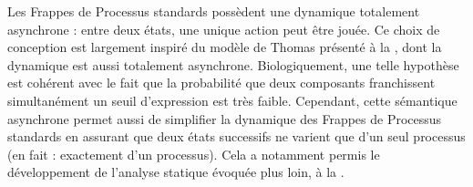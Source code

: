 \begin{remark}
  Les Frappes de Processus standards possèdent une dynamique totalement asynchrone :
  entre deux états, une unique action peut être jouée.
  Ce choix de conception est largement inspiré du modèle de Thomas
  présenté à la ,
  dont la dynamique est aussi totalement asynchrone.
  Biologiquement, une telle hypothèse est cohérent avec le fait que la probabilité
  que deux composants franchissent simultanément un seuil d'expression est très faible.
  Cependant, cette sémantique asynchrone permet aussi de simplifier la dynamique des
  Frappes de Processus standards en assurant que deux états successifs ne varient
  que d'un seul processus (en fait : exactement d'un processus).
  Cela a notamment permis le développement de l'analyse statique évoquée
  plus loin, à la .
\end{remark}



